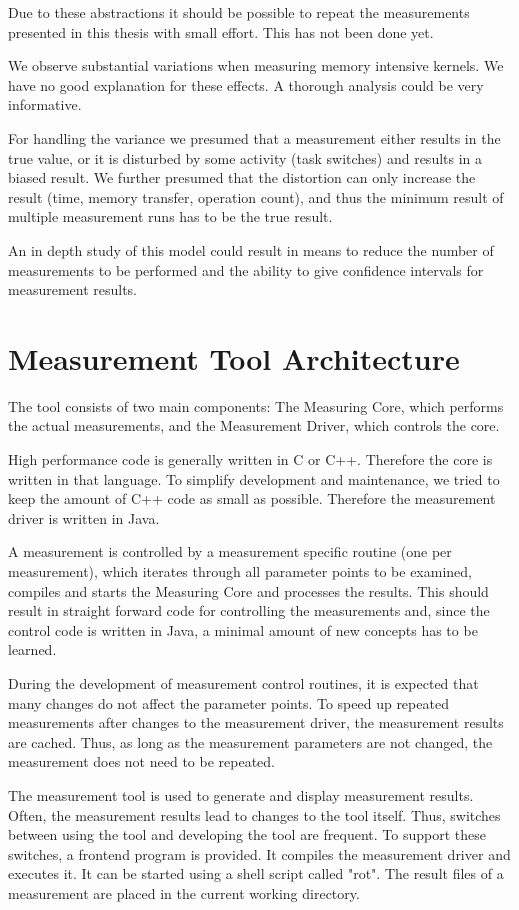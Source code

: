 \documentclass[a4paper,12pt]{article}
\begin{document}
Due to these abstractions it should be possible to repeat the measurements
presented in this thesis with small effort. This has not been done yet.

We observe substantial variations when measuring memory intensive kernels. We
have no good explanation for these effects. A thorough analysis could be very
informative. 

For handling the variance we presumed that a measurement either results in the
true value, or it is disturbed by some activity (task switches) and results in a
biased result. We further presumed that the distortion can only increase the
result (time, memory transfer, operation count), and thus the minimum result of
multiple measurement runs has to be the true result.

An in depth study of this model could result in means to reduce the number of
measurements to be performed and the ability to give confidence intervals for
measurement results.

\clearpage
\appendix
\section{Measurement Tool Architecture}
The tool consists of two main components: The Measuring Core, which performs the
actual measurements, and the Measurement Driver, which controls the core.

High performance code is generally written in C or C++. Therefore the core is
written in that language. To simplify development and maintenance, we tried to
keep the amount of C++ code as small as possible. Therefore the measurement
driver is written in Java.

A measurement is controlled by a measurement specific
routine (one per measurement), which iterates through all parameter points to be examined,
compiles and starts the Measuring Core and processes the results. This should
result in straight forward code for controlling the measurements and, since the
control code is written in Java, a minimal amount of new concepts has to be
learned.

During the development of measurement control routines, it is expected that many
changes do not affect the parameter points. To speed up repeated measurements
after changes to the measurement driver, the measurement results are cached.
Thus, as long as the measurement parameters are not changed, the measurement
does not need to be repeated.

The measurement tool is used to generate and display measurement results. Often,
the measurement results lead to changes to the tool itself. Thus, switches
between using the tool and developing the tool are frequent. To support these
switches, a frontend program is provided. It compiles the measurement driver and
executes it. It can be started using a shell script called "rot". The result
files of a measurement are placed in the current working directory.
\end{document}
